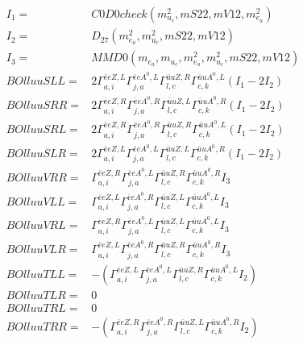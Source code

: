 \documentclass[A4,landscape]{article}
\begin{document}
\begin{align} 
I_1 = & C0D0check(m^2_{u_{{c}}}, mS22, mV12, m^2_{e_{{a}}}) \\ 
I_2 = & D_{27}(m^2_{e_{{a}}}, m^2_{u_{{c}}}, mS22, mV12) \\ 
I_3 = & MMD0(m_{e_{{a}}}, m_{u_{{c}}}, m^2_{e_{{a}}}, m^2_{u_{{c}}}, mS22, mV12) \\ 
  BOlluuSLL= & 2  \Gamma^{\bar{e}e Z ,L}_{a, i} \Gamma^{\bar{e}e A^0 ,L}_{j, a} \Gamma^{\bar{u}u Z ,R}_{l, c} \Gamma^{\bar{u}u A^0 ,L}_{c, k} (I_1 - 2 I_2) \\ 
  BOlluuSRR= & 2  \Gamma^{\bar{e}e Z ,R}_{a, i} \Gamma^{\bar{e}e A^0 ,R}_{j, a} \Gamma^{\bar{u}u Z ,L}_{l, c} \Gamma^{\bar{u}u A^0 ,R}_{c, k} (I_1 - 2 I_2) \\ 
  BOlluuSRL= & 2  \Gamma^{\bar{e}e Z ,R}_{a, i} \Gamma^{\bar{e}e A^0 ,R}_{j, a} \Gamma^{\bar{u}u Z ,R}_{l, c} \Gamma^{\bar{u}u A^0 ,L}_{c, k} (I_1 - 2 I_2) \\ 
  BOlluuSLR= & 2  \Gamma^{\bar{e}e Z ,L}_{a, i} \Gamma^{\bar{e}e A^0 ,L}_{j, a} \Gamma^{\bar{u}u Z ,L}_{l, c} \Gamma^{\bar{u}u A^0 ,R}_{c, k} (I_1 - 2 I_2) \\ 
  BOlluuVRR= &  \Gamma^{\bar{e}e Z ,R}_{a, i} \Gamma^{\bar{e}e A^0 ,L}_{j, a} \Gamma^{\bar{u}u Z ,R}_{l, c} \Gamma^{\bar{u}u A^0 ,R}_{c, k} I_3 \\ 
  BOlluuVLL= &  \Gamma^{\bar{e}e Z ,L}_{a, i} \Gamma^{\bar{e}e A^0 ,R}_{j, a} \Gamma^{\bar{u}u Z ,L}_{l, c} \Gamma^{\bar{u}u A^0 ,L}_{c, k} I_3 \\ 
  BOlluuVRL= &  \Gamma^{\bar{e}e Z ,R}_{a, i} \Gamma^{\bar{e}e A^0 ,L}_{j, a} \Gamma^{\bar{u}u Z ,L}_{l, c} \Gamma^{\bar{u}u A^0 ,L}_{c, k} I_3 \\ 
  BOlluuVLR= &  \Gamma^{\bar{e}e Z ,L}_{a, i} \Gamma^{\bar{e}e A^0 ,R}_{j, a} \Gamma^{\bar{u}u Z ,R}_{l, c} \Gamma^{\bar{u}u A^0 ,R}_{c, k} I_3 \\ 
  BOlluuTLL= & -( \Gamma^{\bar{e}e Z ,L}_{a, i} \Gamma^{\bar{e}e A^0 ,L}_{j, a} \Gamma^{\bar{u}u Z ,R}_{l, c} \Gamma^{\bar{u}u A^0 ,L}_{c, k} I_2) \\ 
  BOlluuTLR= & 0 \\ 
  BOlluuTRL= & 0 \\ 
  BOlluuTRR= & -( \Gamma^{\bar{e}e Z ,R}_{a, i} \Gamma^{\bar{e}e A^0 ,R}_{j, a} \Gamma^{\bar{u}u Z ,L}_{l, c} \Gamma^{\bar{u}u A^0 ,R}_{c, k} I_2) \\ 
\end{align} 
\end{document}
